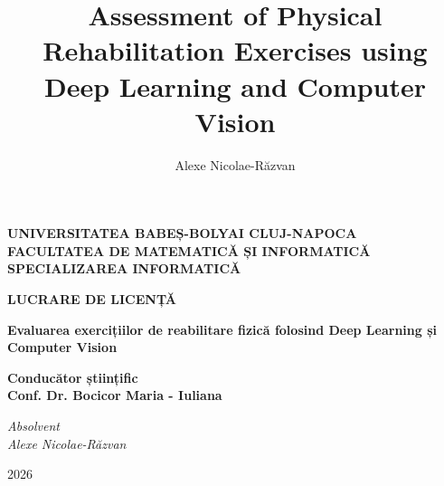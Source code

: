 \documentclass[12pt]{report}
\begin{document}
\title{Assessment of Physical Rehabilitation
Exercises using Deep Learning and
Computer Vision}					   
\author{Alexe Nicolae-Răzvan}											
				
\maketitle


\newpage


\begin{titlepage} 

\begin{center}
{\Large\textbf{
UNIVERSITATEA BABEȘ-BOLYAI CLUJ-NAPOCA \\
FACULTATEA DE MATEMATICĂ ȘI INFORMATICĂ \\
SPECIALIZAREA INFORMATICĂ \\
}}
\end{center}

\vspace{10em}

\begin{center}
{\Huge\textbf{
LUCRARE DE LICENȚĂ
}}
\end{center}

\vspace{3em}

\begin{center}
{\huge\textbf{Evaluarea exercițiilor de reabilitare
fizică folosind
Deep Learning și Computer Vision}}
\end{center}

\vspace{10em}

\begin{flushleft}
{\Large\textbf{
Conducător științific \\ Conf. Dr. Bocicor Maria - Iuliana
}}
\end{flushleft}

\vspace{3em}

\begin{flushright}
{\Large\textit{
Absolvent\\ Alexe Nicolae-Răzvan
}}
\end{flushright}

\vfill

\begin{center}
{\Large{2026}}
\end{center}

\end{titlepage}
\end{document}
